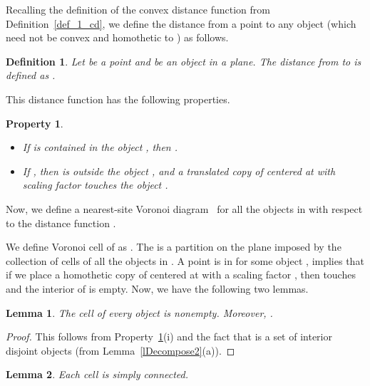 \documentclass[a4paper,11pt]{article}
\newtheorem{lemma}{Lemma}
\newtheorem{definition}{Definition}
\newtheorem{property}{Property}
\begin{document}
Recalling the definition of the convex distance function  from Definition~\ref{def_1_cd}, we define the distance  from  a point  to any 
 object  (which need not be convex and homothetic to ) as follows.

\begin{definition}
 Let  be a point and  be an object in a plane. The distance  
 from    to  
  is defined as .
\end{definition}

This distance function has the following properties.

\begin{property}\label{p5}
 \begin{itemize}
  \item[(i)] If  is contained in the object , then  
.
\item[(ii)] If , then  is outside the object , 
and a translated copy of  centered at  with 
 scaling factor   touches the object .
 \end{itemize}

\end{property}

Now, we define a nearest-site Voronoi diagram~ for all 
the  objects in  with respect 
to the distance 
function 
.
 
We define Voronoi cell of  as . The  is a partition on the plane 
 imposed by the collection of cells of all the objects in .
A point  is in  for some object , 
implies that 
if we place a homothetic copy of  centered at  with a scaling factor 
, then  touches   and the 
interior of  is empty.
Now,  we have the following two lemmas.

 \begin{lemma}\label{lll1}
 The cell of every object  is nonempty. 
Moreover, 
  . 
\end{lemma}
\begin{proof}

This follows from  Property~\ref{p5}(i) and the fact that  is a set of 
interior disjoint  objects (from Lemma~\ref{lDecompose2}(a)).
\end{proof}

 
 \begin{lemma}\label{lll2}
 Each cell    is simply connected. 

\end{lemma}
\end{document}
